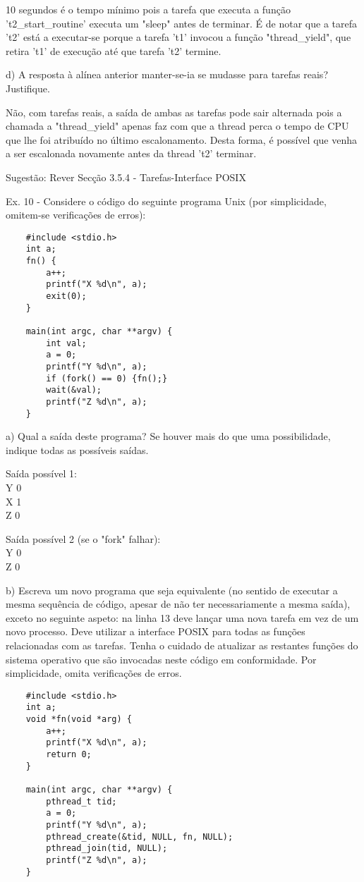 \documentclass[11pt]{article}
\begin{document}
10 segundos é o tempo mínimo pois a tarefa que executa a função 't2\_start\_routine' executa um "sleep" antes de terminar. É de notar que a tarefa 't2' está a executar-se porque a tarefa 't1' invocou a função "thread\_yield", que retira 't1' de execução até que tarefa 't2' termine.

d) A resposta à alínea anterior manter-se-ia se mudasse para tarefas reais? Justifique.

Não, com tarefas reais, a saída de ambas as tarefas pode sair alternada pois a chamada a "thread\_yield" apenas faz com que a thread perca o tempo de CPU que lhe foi atribuído no último escalonamento. Desta forma, é possível que venha a ser escalonada novamente antes da thread 't2' terminar.

Sugestão: Rever Secção 3.5.4 - Tarefas-Interface POSIX


Ex. 10 - Considere o código do seguinte programa Unix (por simplicidade, omitem-se verificações de erros):

\begin{lstlisting}
    #include <stdio.h>
    int a;
    fn() {
        a++;
        printf("X %d\n", a);
        exit(0);
    }

    main(int argc, char **argv) {
        int val;
        a = 0;
        printf("Y %d\n", a);
        if (fork() == 0) {fn();}
        wait(&val);
        printf("Z %d\n", a);
    }
\end{lstlisting}

a) Qual a saída deste programa? Se houver mais do que uma possibilidade, indique todas as possíveis saídas.

Saída possível 1: \\
Y 0 \\
X 1 \\
Z 0

Saída possível 2 (se o "fork" falhar): \\
Y 0 \\
Z 0

b) Escreva um novo programa que seja equivalente (no sentido de executar a mesma sequência de código, apesar de não ter necessariamente a mesma saída), exceto no seguinte aspeto: na linha 13 deve lançar uma nova tarefa em vez de um novo processo. Deve utilizar a interface POSIX para todas as funções relacionadas com as tarefas. Tenha o cuidado de atualizar as restantes funções do sistema operativo que são invocadas neste código em conformidade. Por simplicidade, omita verificações de erros.

\begin{lstlisting}
    #include <stdio.h>
    int a;
    void *fn(void *arg) {
        a++;
        printf("X %d\n", a);
        return 0;
    }

    main(int argc, char **argv) {
        pthread_t tid;
        a = 0;
        printf("Y %d\n", a);
        pthread_create(&tid, NULL, fn, NULL);
        pthread_join(tid, NULL);
        printf("Z %d\n", a);
    }
\end{lstlisting}
\end{document}

